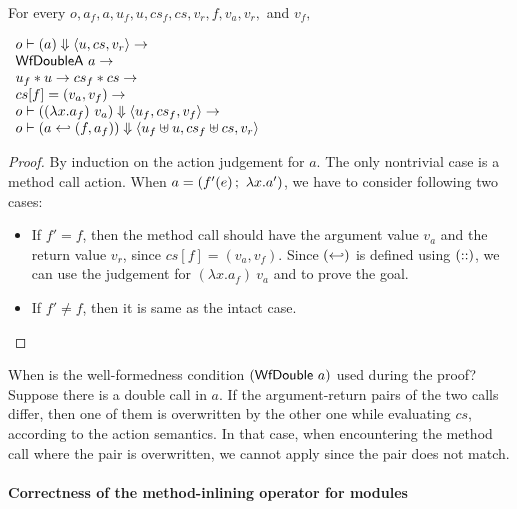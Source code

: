 \begin{lemma}
  \label{lem-inlinedm-action-call}
  \mbox{}\\
  For every $o, a_f, a, u_f, u, cs_f, cs, v_r, f, v_a, v_r,$ and $v_f,$
  \begin{center}
    \begin{math}
      \begin{array}{l}
        \semact{o}{a}{u}{cs}{v_r} \to \\
        \wfdoublea{a} \to \\
        \sdisj{u_f}{u} \to \mdisj{cs_f}{cs} \to \\
        cs[f] = (v_a, v_f) \to \\
        \semact{o}{(\lambda x.a_f)\ v_a}{u_f}{cs_f}{v_f} \to \\
        \semact{o}{\inlinedm{a}{(f, a_f)}}{\splus{u_f}{u}}{\mplus{cs_f}{cs}}{v_r}
      \end{array}
    \end{math}
  \end{center}
\end{lemma}
\begin{proof}
  By induction on the action judgement for $a$. The only nontrivial
  case is a method call action. When $a = (\actcall{x}{f'}{e}{a'})$,
  we have to consider following two cases:
  \begin{itemize}
  \item If $f' = f$, then the method call should have the argument
    value $v_a$ and the return value $v_r$, since $cs[f] = (v_a,
    v_f)$. Since $(\inlinedmsymb)$ is defined using $(\concatsymb)$,
    we can use the judgement for $(\lambda x.a_f)\ v_a$ and
     to prove the goal.
  \item If $f' \neq f$, then it is same as the intact case.
  \end{itemize}
\end{proof}

When is the well-formedness condition $(\wfdouble{a})$ used during the
proof? Suppose there is a double call in $a$. If the argument-return
pairs of the two calls differ, then one of them is overwritten by the
other one while evaluating $cs$, according to the action semantics. In
that case, when encountering the method call where the pair is
overwritten, we cannot apply  since the pair
does not match.

\paragraph{Correctness of the method-inlining operator for modules}

